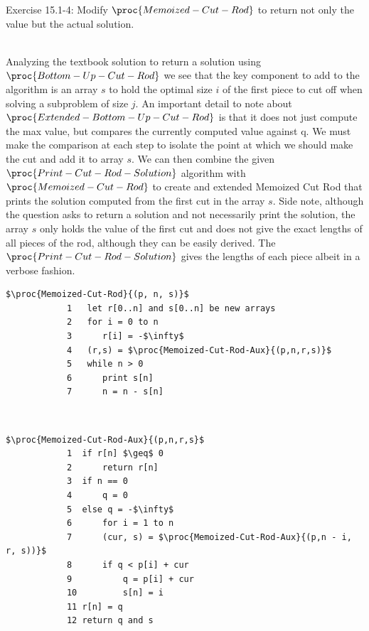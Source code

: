 \documentclass[addpoints,11pt]{exam}
\begin{document}
\begin{questions}
\begin{solutionorbox}
		\end{solutionorbox}
		
		\ifprintanswers
		\newpage
		\else
		\bigskip
		\fi
		
		
		\question[5]
		Exercise 15.1-4:  Modify $\proc{Memoized-Cut-Rod}$ to return not only the value but the actual solution.
		\begin{solutionorbox} \\
			Analyzing the textbook solution to return a solution using $\proc{Bottom-Up-Cut-Rod}$ we see that the key component to add to the algorithm is an array $s$ to hold the optimal size $i$ of the first piece to cut off when solving a subproblem of size $j$. An important detail to note about $\proc{Extended-Bottom-Up-Cut-Rod}$ is that it does not just compute the max value, but compares the currently computed value against q. We must make the comparison at each step to isolate the point at which we should make the cut and add it to array $s$. We can then combine the given $\proc{Print-Cut-Rod-Solution}$ algorithm with $\proc{Memoized-Cut-Rod}$ to create and extended Memoized Cut Rod that prints the solution computed from the first cut in the array $s$. Side note, although the question asks to return a solution and not necessarily print the solution, the array $s$ only holds the value of the first cut and does not give the exact lengths of all pieces of the rod, although they can be easily derived. The $\proc{Print-Cut-Rod-Solution}$ gives the lengths of each piece albeit in a verbose fashion. \\
			\begin{lstlisting}[mathescape=true]
			$\proc{Memoized-Cut-Rod}{(p, n, s)}$
			1   let r[0..n] and s[0..n] be new arrays
			2   for i = 0 to n
			3      r[i] = -$\infty$
			4   (r,s) = $\proc{Memoized-Cut-Rod-Aux}{(p,n,r,s)}$
			5   while n > 0
			6      print s[n]
			7      n = n - s[n]
			\end{lstlisting}
			\\
			\begin{lstlisting}[mathescape=true]
			$\proc{Memoized-Cut-Rod-Aux}{(p,n,r,s}$
			1  if r[n] $\geq$ 0
			2      return r[n]
			3  if n == 0
			4      q = 0
			5  else q = -$\infty$
			6      for i = 1 to n
			7      (cur, s) = $\proc{Memoized-Cut-Rod-Aux}{(p,n - i, r, s))}$
			8      if q < p[i] + cur
			9          q = p[i] + cur
			10         s[n] = i
			11 r[n] = q
			12 return q and s
			\end{lstlisting}
		\end{solutionorbox}
		

\end{questions}
\end{document}
